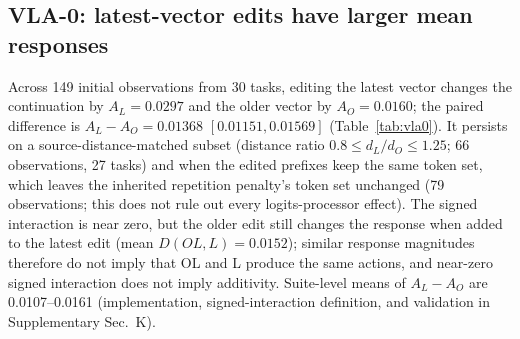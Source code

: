 \subsection{VLA-0: latest-vector edits have larger mean responses}
\label{sec:vla0open}
Across 149 initial observations from 30 tasks, editing the latest vector changes the continuation by $A_L=0.0297$ and the older vector by $A_O=0.0160$; the paired difference is $A_L-A_O=0.01368$ $[0.01151,0.01569]$ (Table~\ref{tab:vla0}). It persists on a source-distance-matched subset (distance ratio $0.8\leq d_L/d_O\leq1.25$; 66 observations, 27 tasks) and when the edited prefixes keep the same token set, which leaves the inherited repetition penalty's token set unchanged (79 observations; this does not rule out every logits-processor effect). The signed interaction is near zero, but the older edit still changes the response when added to the latest edit (mean $D(OL,L)=0.0152$); similar response magnitudes therefore do not imply that OL and L produce the same actions, and near-zero signed interaction does not imply additivity. Suite-level means of $A_L-A_O$ are 0.0107--0.0161 (implementation, signed-interaction definition, and validation in Supplementary Sec.~K).

